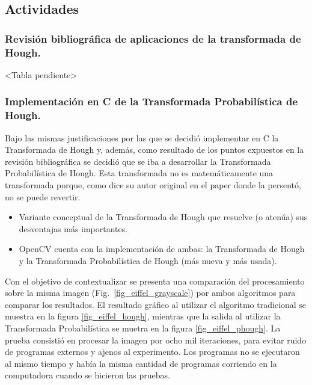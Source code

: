 \subsection{Actividades}


\subsubsection[Revisión bibliográfica transformada de Hough.]{Revisión bibliográfica de aplicaciones de la transformada de Hough.}
<Tabla pendiente>


\subsubsection[Código C de la T. Probabilística de Hough]{Implementación en C de la Transformada Probabilística de Hough.}

Bajo las mismas justificaciones por las que se decidió implementar en C la Transformada de Hough y, además, como resultado de los puntos expuestos en la revisión bibliográfica se decidió que se iba a desarrollar la Transformada Probabilística de Hough. Esta transformada no es matemáticamente una transformada porque, como dice su autor original en el paper donde la persentó, no se puede revertir.





\begin{itemize}
	\item Variante conceptual de la Transformada de Hough que resuelve (o atenúa) sus desventajas más importantes.
	\item OpenCV cuenta con la implementación de ambas: la Transformada de Hough y la Transformada Probabilística de Hough (más nueva y más usada).
\end{itemize}



Con el objetivo de contextualizar se presenta una comparación del procesamiento sobre la misma imagen (Fig.~\ref{fig_eiffel_grayscale}) por ambos algoritmos para comparar los resultados. El resultado gráfico al utilizar el algoritmo tradicional se muestra en la figura \ref{fig_eiffel_hough}, mientras que la salida al utilizar la Transformada Probabilística se muetra en la figura \ref{fig_eiffel_phough}. La prueba consistió en procesar la imagen por ocho mil iteraciones, para evitar ruido de programas externos y ajenos al experimento. Los programas no se ejecutaron al mismo tiempo y había la misma cantidad de programas corriendo en la computadora cuando se hicieron las pruebas.

